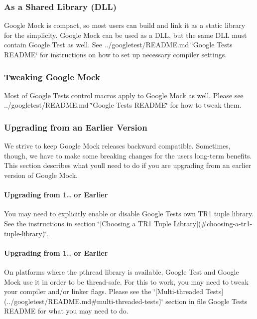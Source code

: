 \subsubsection*{As a Shared Library (D\+LL)}

Google Mock is compact, so most users can build and link it as a static library for the simplicity. Google Mock can be used as a D\+LL, but the same D\+LL must contain Google Test as well. See ../googletest/\+R\+E\+A\+D\+ME.md \char`\"{}\+Google Test\textquotesingle{}s R\+E\+A\+D\+M\+E\char`\"{} for instructions on how to set up necessary compiler settings.

\subsubsection*{Tweaking Google Mock}

Most of Google Test\textquotesingle{}s control macros apply to Google Mock as well. Please see ../googletest/\+R\+E\+A\+D\+ME.md \char`\"{}\+Google Test\textquotesingle{}s R\+E\+A\+D\+M\+E\char`\"{} for how to tweak them.

\subsubsection*{Upgrading from an Earlier Version}

We strive to keep Google Mock releases backward compatible. Sometimes, though, we have to make some breaking changes for the users\textquotesingle{} long-\/term benefits. This section describes what you\textquotesingle{}ll need to do if you are upgrading from an earlier version of Google Mock.

\paragraph*{Upgrading from 1.. or Earlier}

You may need to explicitly enable or disable Google Test\textquotesingle{}s own T\+R1 tuple library. See the instructions in section \char`\"{}\mbox{[}\+Choosing a T\+R1 Tuple
\+Library\mbox{]}(\#choosing-\/a-\/tr1-\/tuple-\/library)\char`\"{}.

\paragraph*{Upgrading from 1.. or Earlier}

On platforms where the pthread library is available, Google Test and Google Mock use it in order to be thread-\/safe. For this to work, you may need to tweak your compiler and/or linker flags. Please see the \char`\"{}\mbox{[}\+Multi-\/threaded Tests\mbox{]}(../googletest/\+R\+E\+A\+D\+M\+E.\+md\#multi-\/threaded-\/tests)\char`\"{} section in file Google Test\textquotesingle{}s R\+E\+A\+D\+ME for what you may need to do.

